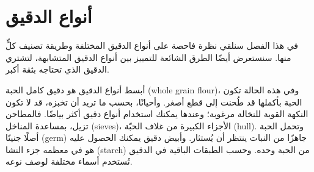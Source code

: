 %
%
%

\chapter{أنواع الدقيق}\label{ch:flour-types}

\begin{quoting}
في هذا الفصل سنلقي نظرة فاحصة على أنواع الدقيق المختلفة وطريقة تصنيف كلٍّ منها. سنستعرض أيضًا الطرق الشائعة للتمييز بين أنواع الدقيق المتشابهة، لتشتري الدقيق الذي تحتاجه بثقة أكبر.
\end{quoting}

أبسط أنواع الدقيق هو دقيق كامل الحبة \textenglish{(whole grain flour)}، وفي هذه الحالة تكون الحبة بأكملها قد طُحنت إلى قطع أصغر. وأحيانًا، بحسب ما تريد أن تخبزه، قد لا تكون النكهة القوية للنخالة مرغوبة؛ وعندها يمكنك استخدام أنواع دقيق أكثر بياضًا. فالمطاحن تزيل، بمساعدة المناخل \textenglish{(sieves)}، الأجزاء الكبيرة من غلاف الحبّة \textenglish{(hull)}. وتحمل الحبة أصلًا جنينًا \textenglish{(germ)} جاهزًا من النبات ينتظر أن يُستثار. وأبيض دقيق يمكنك الحصول عليه هو في معظمه جزء النشا \textenglish{(starch)} من الحبة وحده. وحسب الطبقات الباقية في الدقيق تُستخدم أسماء مختلفة لوصف نوعه.

\begin{table}[!htb]
\centering

\caption[تسمية دقيق القمح]{مقارنة بين طريقة تسمية أنواع دقيق القمح المختلفة في دول مختلفة.}\label{tab:flour-types-comparison}
\end{table}

